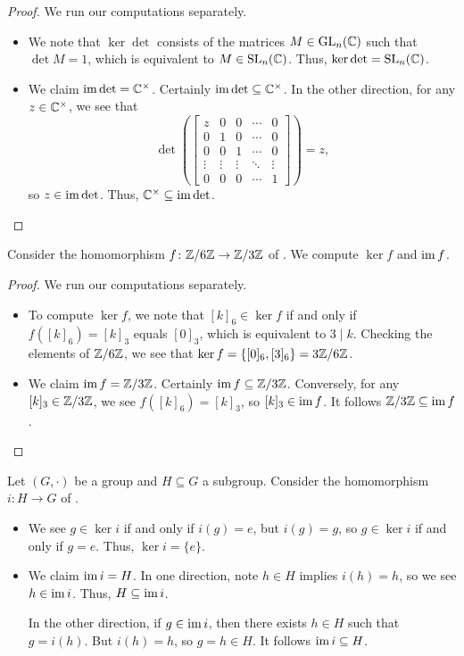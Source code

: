 \documentclass[../main.tex]{subfiles}
\begin{document}
\begin{proof}
    We run our computations separately.
    \begin{itemize}
        \item We note that $\ker\det$ consists of the matrices $M\in\operatorname{GL}_n(\mathbb C)$ such that $\det M=1$, which is equivalent to $M\in\operatorname{SL}_n(\mathbb C)$. Thus, $\ker\det=\operatorname{SL}_n(\mathbb C)$.
        \item We claim $\operatorname{im}\det=\mathbb C^\times$. Certainly $\operatorname{im}\det\subseteq\mathbb C^\times$. In the other direction, for any $z\in\mathbb C^\times$, we see that
        \[\det\left(\begin{bmatrix}
            z & 0 & 0 & \cdots & 0 \\
            0 & 1 & 0 & \cdots & 0 \\
            0 & 0 & 1 & \cdots & 0 \\
            \vdots & \vdots & \vdots & \ddots & \vdots \\
            0 & 0 & 0 & \cdots & 1
        \end{bmatrix}\right)=z,\]
        so $z\in\operatorname{im}\det$. Thus, $\mathbb C^\times\subseteq\operatorname{im}\det$.
        \qedhere
    \end{itemize}
\end{proof}
\begin{example} \label{ex:z6z-to-z3z-ker-im}
    Consider the homomorphism $f\colon\mathbb Z/6\mathbb Z\to\mathbb Z/3\mathbb Z$ of . We compute $\ker f$ and $\operatorname{im} f$.
\end{example}
\begin{proof}
    We run our computations separately.
    \begin{itemize}
        \item To compute $\ker f$, we note that $[k]_6\in\ker f$ if and only if $f([k]_6)=[k]_3$ equals $[0]_3$, which is equivalent to $3\mid k$. Checking the elements of $\mathbb Z/6\mathbb Z$, we see that $\ker f=\{[0]_6,[3]_6\}=3\mathbb Z/6\mathbb Z$.
        \item We claim $\operatorname{im} f=\mathbb Z/3\mathbb Z$. Certainly $\operatorname{im} f\subseteq\mathbb Z/3\mathbb Z$. Conversely, for any $[k]_3\in\mathbb Z/3\mathbb Z$, we see $f([k]_6)=[k]_3$, so $[k]_3\in\operatorname{im} f$. It follows $\mathbb Z/3\mathbb Z\subseteq\operatorname{im} f$.
        \qedhere
    \end{itemize}
\end{proof}
\begin{example}
    Let $(G,\cdot)$ be a group and $H\subseteq G$ a subgroup. Consider the homomorphism $i\colon H\to G$ of .
    \begin{itemize}
        \item We see $g\in\ker i$ if and only if $i(g)=e$, but $i(g)=g$, so $g\in\ker i$ if and only if $g=e$. Thus, $\ker i=\{e\}$.
        \item We claim $\operatorname{im} i=H$. In one direction, note $h\in H$ implies $i(h)=h$, so we see $h\in\operatorname{im} i$. Thus, $H\subseteq\operatorname{im} i$.
        
        In the other direction, if $g\in\operatorname{im} i$, then there exists $h\in H$ such that $g=i(h)$. But $i(h)=h$, so $g=h\in H$. It follows $\operatorname{im} i\subseteq H$.
    \end{itemize}
\end{example}
\end{document}
